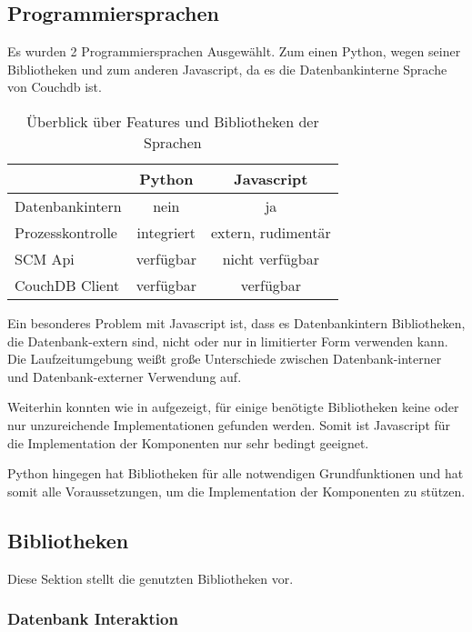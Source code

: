  
\subsection{Programmiersprachen}

Es wurden 2 Programmiersprachen Ausgew\"ahlt.
Zum einen Python, wegen seiner Bibliotheken und
zum anderen Javascript, da es die Datenbankinterne Sprache von Couchdb ist.

\begin{table}[ht]
\centering
\begin{tabular}{l|c|c}
                            & \textbf{Python} & \textbf{Javascript} \\
    \hline
    Datenbankintern         & nein            & ja \\
    Prozesskontrolle        & integriert      & extern, rudimentär \\
    SCM Api                 & verfügbar       & nicht verfügbar \\
    CouchDB Client          & verfügbar       & verfügbar \\
\end{tabular}
\caption{Überblick über Features und Bibliotheken der Sprachen}
\label{tab:python-vs-js}
\end{table}

Ein besonderes Problem mit Javascript ist,
dass es Datenbankintern Bibliotheken, die Datenbank-extern sind,
nicht oder nur in limitierter Form verwenden kann.
Die Laufzeitumgebung weißt große Unterschiede
zwischen Datenbank-interner und Datenbank-externer Verwendung auf.

Weiterhin konnten wie in  aufgezeigt,
für einige benötigte Bibliotheken keine
oder nur unzureichende Implementationen gefunden werden.
Somit ist Javascript für die Implementation der Komponenten
nur sehr bedingt geeignet.

Python hingegen hat Bibliotheken für alle notwendigen Grundfunktionen
und hat somit alle Voraussetzungen,
um die Implementation der Komponenten zu stützen.

\subsection{Bibliotheken}

Diese Sektion stellt die genutzten Bibliotheken vor.

\subsubsection{Datenbank Interaktion}

